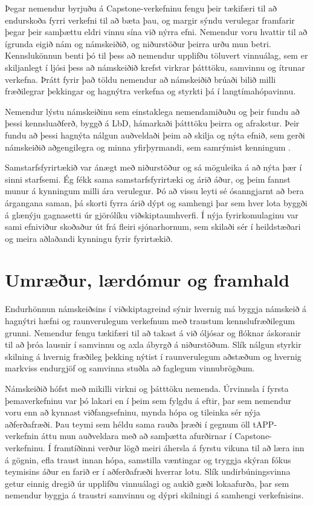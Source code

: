 \documentclass{article}
\begin{document}
Þegar nemendur byrjuðu á Capstone-verkefninu fengu þeir tækifæri til að endurskoða fyrri verkefni til að bæta þau, og margir sýndu verulegar framfarir þegar þeir samþættu eldri vinnu sína við nýrra efni. Nemendur voru hvattir til að ígrunda eigið nám og námskeiðið, og niðurstöður þeirra urðu mun betri. 
Kennslukönnun benti þó til þess að nemendur upplifðu töluvert vinnuálag, sem er skiljanlegt í ljósi þess að námskeiðið krefst virkrar þátttöku, samvinnu og ítrunar verkefna. Þrátt fyrir það töldu nemendur að námskeiðið brúaði bilið milli fræðilegrar þekkingar og hagnýtra verkefna og styrkti þá í langtímahópavinnu.

Nemendur lýstu námskeiðinu sem einstaklega nemendamiðuðu og þeir fundu að þessi kennsluaðferð, byggð á LbD, hámarkaði þátttöku þeirra og afrakstur. Þeir fundu að þessi hagnýta nálgun auðveldaði þeim að skilja og nýta efnið, sem gerði námskeiðið aðgengilegra og minna yfirþyrmandi, sem samrýmist kenningum \cite{kolb1984experiential}.

Samstarfsfyrirtækið var ánægt með niðurstöður og sá möguleika á að nýta þær í sinni starfsemi. Ég fékk sama samstarfsfyrirtæki og árið áður, og þeim fannst munur á kynningum milli ára verulegur. Þó að vissu leyti sé ósanngjarnt að bera árgangana saman, þá skorti fyrra árið dýpt og samhengi þar sem hver lota byggði á glænýju gagnasetti úr gjörólíku viðskiptaumhverfi. Í nýja fyrirkomulaginu var sami efniviður skoðaður út frá fleiri sjónarhornum, sem skilaði sér í heildstæðari og meira aðlaðandi kynningu fyrir fyrirtækið.

\section*{Umræður, lærdómur og framhald}
Endurhönnun námskeiðsins í viðskiptagreind sýnir hvernig má byggja námskeið á hagnýtri hæfni og raunverulegum verkefnum með traustum kennslufræðilegum grunni. Nemendur fengu tækifæri til að takast á við óljósar og flóknar áskoranir til að þróa lausnir í samvinnu og axla ábyrgð á niðurstöðum. Slík nálgun styrkir skilning á hvernig fræðileg þekking nýtist í raunverulegum aðstæðum og hvernig markviss endurgjöf og samvinna stuðla að faglegum vinnubrögðum.

Námskeiðið hófst með mikilli virkni og þátttöku nemenda. Úrvinnsla í fyrsta þemaverkefninu var þó lakari en í þeim sem fylgdu á eftir, þar sem nemendur voru enn að kynnast viðfangsefninu, mynda hópa og tileinka sér nýja aðferðafræði. Þau teymi sem héldu sama rauða þræði í gegnum öll tAPP-verkefnin áttu mun auðveldara með að samþætta afurðirnar í Capstone-verkefninu. Í framtíðinni verður lögð meiri áhersla á fyrstu vikuna til að læra inn á gögnin, efla traust innan hópa, samstilla væntingar og tryggja skýran fókus teymisins áður en farið er í aðferðafræði hverrar lotu. Slík undirbúningsvinna getur einnig dregið úr upplifðu vinnuálagi og aukið gæði lokaafurða, þar sem nemendur byggja á traustri samvinnu og dýpri skilningi á samhengi verkefnisins.
\end{document}
